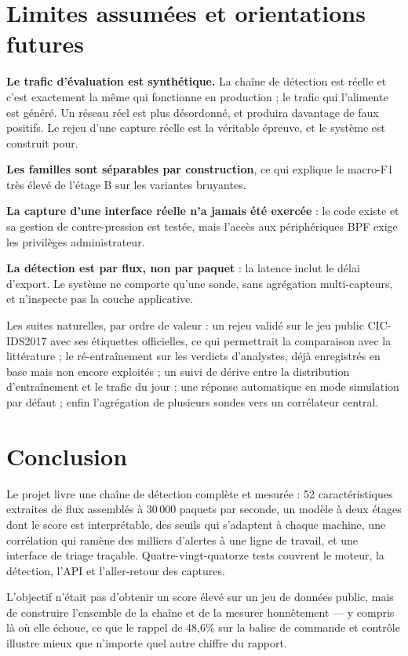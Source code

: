 \documentclass[11pt,a4paper]{article}
\begin{document}
\section{Limites assumées et orientations futures}

\textbf{Le trafic d'évaluation est synthétique.} La chaîne de détection est réelle et c'est
exactement la même qui fonctionne en production ; le trafic qui l'alimente est généré. Un réseau
réel est plus désordonné, et produira davantage de faux positifs. Le rejeu d'une capture réelle est
la véritable épreuve, et le système est construit pour.

\textbf{Les familles sont séparables par construction}, ce qui explique le macro-F1 très élevé de
l'étage B sur les variantes bruyantes.

\textbf{La capture d'une interface réelle n'a jamais été exercée} : le code existe et sa gestion de
contre-pression est testée, mais l'accès aux périphériques BPF exige les privilèges administrateur.

\textbf{La détection est par flux, non par paquet} : la latence inclut le délai d'export. Le système
ne comporte qu'une sonde, sans agrégation multi-capteurs, et n'inspecte pas la couche applicative.

Les suites naturelles, par ordre de valeur : un rejeu validé sur le jeu public CIC-IDS2017 avec ses
étiquettes officielles, ce qui permettrait la comparaison avec la littérature ; le ré-entraînement
sur les verdicts d'analystes, déjà enregistrés en base mais non encore exploités ; un suivi de
dérive entre la distribution d'entraînement et le trafic du jour ; une réponse automatique en mode
simulation par défaut ; enfin l'agrégation de plusieurs sondes vers un corrélateur central.

\section{Conclusion}

Le projet livre une chaîne de détection complète et mesurée : 52 caractéristiques extraites de flux
assemblés à 30\,000 paquets par seconde, un modèle à deux étages dont le score est interprétable,
des seuils qui s'adaptent à chaque machine, une corrélation qui ramène des milliers d'alertes à une
ligne de travail, et une interface de triage traçable. Quatre-vingt-quatorze tests couvrent le
moteur, la détection, l'API et l'aller-retour des captures.

L'objectif n'était pas d'obtenir un score élevé sur un jeu de données public, mais de construire
l'ensemble de la chaîne et de la mesurer honnêtement --- y compris là où elle échoue, ce que le
rappel de 48,6\% sur la balise de commande et contrôle illustre mieux que n'importe quel autre
chiffre du rapport.
\end{document}
